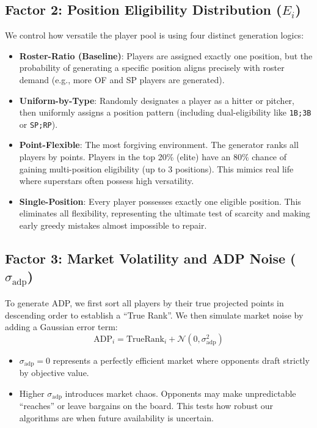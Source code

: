 \documentclass[11pt,a4paper]{article}
\begin{document}
\subsection{Factor 2: Position Eligibility Distribution ($E_i$)}
We control how versatile the player pool is using four distinct generation logics:
\begin{itemize}[leftmargin=1.5em]
    \item \textbf{Roster-Ratio (Baseline)}: Players are assigned exactly one position, but the probability of generating a specific position aligns precisely with roster demand (e.g., more OF and SP players are generated).
    \item \textbf{Uniform-by-Type}: Randomly designates a player as a hitter or pitcher, then uniformly assigns a position pattern (including dual-eligibility like \texttt{1B;3B} or \texttt{SP;RP}).
    \item \textbf{Point-Flexible}: The most forgiving environment. The generator ranks all players by points. Players in the top 20\% (elite) have an $80\%$ chance of gaining multi-position eligibility (up to 3 positions). This mimics real life where superstars often possess high versatility.
    \item \textbf{Single-Position}: Every player possesses exactly one eligible position. This eliminates all flexibility, representing the ultimate test of scarcity and making early greedy mistakes almost impossible to repair.
\end{itemize}

\subsection{Factor 3: Market Volatility and ADP Noise ($\sigma_{\text{adp}}$)}
To generate ADP, we first sort all players by their true projected points in descending order to establish a ``True Rank''. We then simulate market noise by adding a Gaussian error term:
\[ \text{ADP}_i = \text{TrueRank}_i + \mathcal{N}(0, \sigma_{\text{adp}}^2) \]
\begin{itemize}[leftmargin=1.5em]
    \item $\sigma_{\text{adp}} = 0$ represents a perfectly efficient market where opponents draft strictly by objective value.
    \item Higher $\sigma_{\text{adp}}$ introduces market chaos. Opponents may make unpredictable ``reaches'' or leave bargains on the board. This tests how robust our algorithms are when future availability is uncertain.
\end{itemize}
\end{document}
